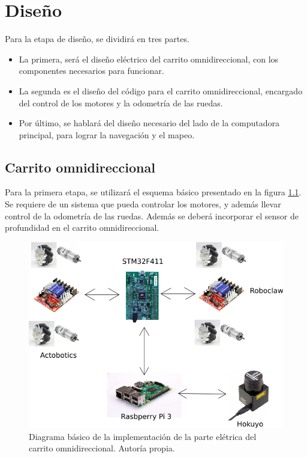   \chapter{Diseño}
\label{C:diseño}

Para la etapa de diseño, se dividirá en tres partes.

\begin{itemize}
\item La primera, será el diseño eléctrico del carrito omnidireccional, con los componentes necesarios para funcionar.
\item La segunda es el diseño del código para el carrito omnidireccional, encargado del control de los motores y la odometría de las ruedas.
\item Por último, se hablará del diseño necesario del lado de la computadora principal, para lograr la navegación y el mapeo.
\end{itemize}

\newpage

\section{Carrito omnidireccional}
Para la primera etapa, se utilizará el esquema básico presentado en la figura \ref{F:diagrama}. Se requiere de un sistema que pueda controlar los motores, y además llevar control de la odometría de las ruedas. Además se deberá incorporar el sensor de profundidad en el carrito omnidireccional.

\begin{figure}[H]
\centering
\includegraphics[scale=0.6]{imagenes/diagrama_diseno.png}
\caption{Diagrama básico de la implementación de la parte elétrica del carrito omnidireccional. Autoría propia.}
\label{F:diagrama}
\end{figure}

